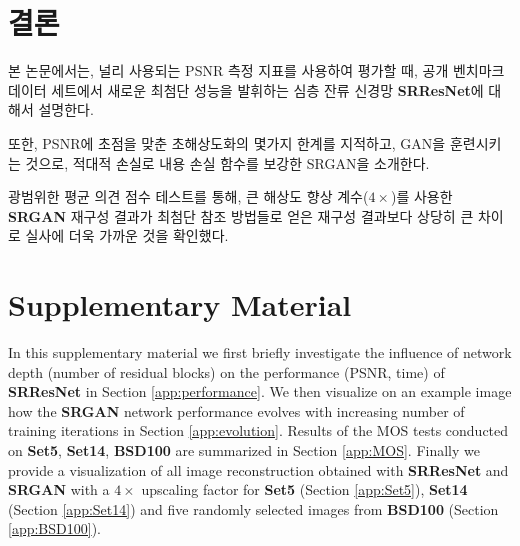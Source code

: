 \documentclass[10pt,twocolumn,letterpaper]{article}
\newcommand{\kor}[1]{#1}
\newcommand{\eng}[1]{}
\newcommand{\summary}[1]{}
\begin{document}
\summary{
콘텐츠 손실의 선택은 초해상도화 결과에 큰 영향을 미침. 이상적인 손실 함수는 응용에 따라 달라질 수 있으며, 픽셀 공간의 변화에 불변하도록 내용 손실 함수를 개발한다면 결과를 더욱 향상시킬 수 있을 것으로 보임.
}
%
\section{\eng{Conclusion}\kor{결론}}
\label{sec:conclusion}
\eng{
We have described a deep residual network \textbf{SRResNet} that sets a new state of the art on public benchmark datasets when evaluated with the widely used \ac{PSNR} measure.
}\kor{
본 논문에서는, 널리 사용되는 \ac{PSNR} 측정 지표를 사용하여 평가할 때, 공개 벤치마크 데이터 세트에서 새로운 최첨단 성능을 발휘하는 심층 잔류 신경망 \textbf{SRResNet}에 대해서 설명한다.
} \eng{
We have highlighted some limitations of this \ac{PSNR}-focused image super-resolution and introduced \textbf{SRGAN}, which augments the content loss function with an adversarial loss by training a \ac{GAN}.
}\kor{
또한, \ac{PSNR}에 초점을 맞춘 초해상도화의 몇가지 한계를 지적하고, \ac{GAN}을 훈련시키는 것으로, 적대적 손실로 내용 손실 함수를 보강한 \ac{SRGAN}을 소개한다.
}\eng{
Using extensive \ac{MOS} testing, we have confirmed that \textbf{SRGAN} reconstructions for large upscaling factors ($4\times$) are, by a considerable margin, more photo-realistic than reconstructions obtained with state-of-the-art reference methods.
}\kor{
광범위한 \ac{평균 의견 점수} 테스트를 통해, 큰 해상도 향상 계수($4\times$)를 사용한 \textbf{SRGAN} 재구성 결과가 최첨단 참조 방법들로 얻은 재구성 결과보다 상당히 큰 차이로 실사에 더욱 가까운 것을 확인했다.
}

\summary{
본 논문에서는 PSNR 기반 초해상도화의 한계를 지적하며, 적대적 손실로 내용 손실 함수를 보강한 SRGAN을 소개하였음. SRGAN의 결과는 최첨단 참조 방법들보다 실사에 더 가까운 것을 확인함.
}

{\footnotesize


}
\clearpage
\setcounter{section}{0}
\renewcommand{\thesection}{\Alph{section}}
\onecolumn
\section{Supplementary Material}
In this supplementary material we first briefly investigate the influence of network depth (number of residual blocks) on the performance (PSNR, time) of \textbf{SRResNet} in Section \ref{app:performance}. We then visualize on an example image how the \textbf{SRGAN} network performance evolves with increasing number of training iterations in Section \ref{app:evolution}. Results of the \ac{MOS} tests conducted on \textbf{Set5}, \textbf{Set14}, \textbf{BSD100} are summarized in Section \ref{app:MOS}. Finally we provide a visualization of all image reconstruction obtained with \textbf{SRResNet} and \textbf{SRGAN} with a $4\times$ upscaling factor for \textbf{Set5} (Section \ref{app:Set5}), \textbf{Set14} (Section \ref{app:Set14}) and five randomly selected images from \textbf{BSD100} (Section \ref{app:BSD100}).\\
\end{document}
